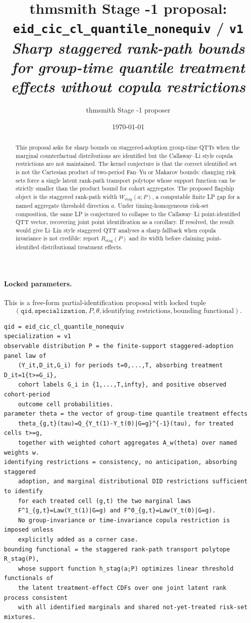 \documentclass[11pt]{article}
\title{thmsmith Stage -1 proposal: \texttt{eid\_cic\_cl\_quantile\_nonequiv} / \texttt{v1}%
  \\ \large\textit{Sharp staggered rank-path bounds for group-time quantile treatment effects without copula restrictions}}
\author{thmsmith Stage -1 proposer}
\date{\today}
\theoremstyle{definition}
\theoremstyle{plain}
\theoremstyle{remark}
\begin{document}
\maketitle


\paragraph{Locked parameters.}
This is a free-form partial-identification proposal with locked tuple
\[
(\texttt{qid},\texttt{specialization},P,\theta,\text{identifying restrictions},\text{bounding functional}).
\]
\begin{verbatim}
qid = eid_cic_cl_quantile_nonequiv
specialization = v1
observable distribution P = the finite-support staggered-adoption panel law of
    (Y_it,D_it,G_i) for periods t=0,...,T, absorbing treatment D_it=1{t>=G_i},
    cohort labels G_i in {1,...,T,infty}, and positive observed cohort-period
    outcome cell probabilities.
parameter theta = the vector of group-time quantile treatment effects
    theta_{g,t}(tau)=Q_{Y_t(1)-Y_t(0)|G=g}^{-1}(tau), for treated cells t>=g,
    together with weighted cohort aggregates A_w(theta) over named weights w.
identifying restrictions = consistency, no anticipation, absorbing staggered
    adoption, and marginal distributional DID restrictions sufficient to identify
    for each treated cell (g,t) the two marginal laws
    F^1_{g,t}=Law(Y_t(1)|G=g) and F^0_{g,t}=Law(Y_t(0)|G=g).
    No group-invariance or time-invariance copula restriction is imposed unless
    explicitly added as a corner case.
bounding functional = the staggered rank-path transport polytope R_stag(P),
    whose support function h_stag(a;P) optimizes linear threshold functionals of
    the latent treatment-effect CDFs over one joint latent rank process consistent
    with all identified marginals and shared not-yet-treated risk-set mixtures.
\end{verbatim}

\begin{abstract}
This proposal asks for sharp bounds on staggered-adoption group-time QTTs when the marginal counterfactual distributions are identified but the Callaway--Li style copula restrictions are not maintained.  The kernel conjecture is that the correct identified set is not the Cartesian product of two-period Fan--Yu or Makarov bounds: changing risk sets force a single latent rank-path transport polytope whose support function can be strictly smaller than the product bound for cohort aggregates.  The proposed flagship object is the staggered rank-path width \(W_{\mathrm{stag}}(a;P)\), a computable finite LP gap for a named aggregate threshold direction \(a\).  Under timing-homogeneous risk-set composition, the same LP is conjectured to collapse to the Callaway--Li point-identified QTT vector, recovering joint point identification as a corollary.  If resolved, the result would give Li--Lin style staggered QTT analyses a sharp fallback when copula invariance is not credible: report \(R_{\mathrm{stag}}(P)\) and its width before claiming point-identified distributional treatment effects.
\end{abstract}
\end{document}

